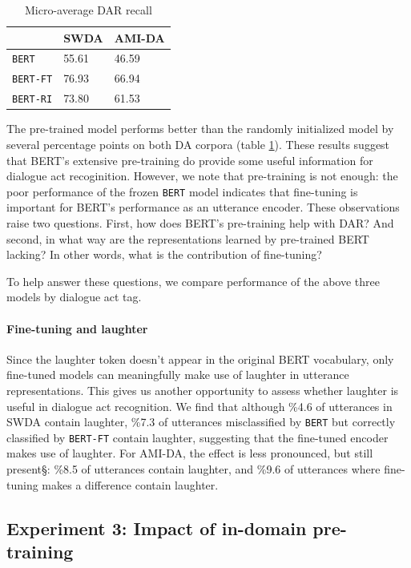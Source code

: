 \documentclass[11pt,a4paper]{article}
\begin{document}
\begin{table}[]
\centering 
\begin{tabular}{@{}lll@{}}
\toprule
                 & SWDA  & AMI-DA \\ \midrule
\texttt{BERT}       & 55.61 & 46.59  \\
\texttt{BERT-FT}    & 76.93 & 66.94  \\
\texttt{BERT-RI}    & 73.80 & 61.53  
\end{tabular}
  \caption{Micro-average DAR recall}
  \label{table:exp2-avg}
\end{table}    

The pre-trained model performs better than the randomly initialized model by several percentage points on both DA corpora (table \ref{table:exp2-avg}). 
These results suggest that BERT's extensive pre-training do provide some useful information for dialogue act recoginition.
However, we note that pre-training is not enough: the poor performance of the frozen \texttt{BERT} model indicates that fine-tuning is important for BERT's performance as an utterance encoder.
These observations raise two questions.
First, how does BERT's pre-training help with DAR? 
And second, in what way are the representations learned by pre-trained BERT lacking?
In other words, what is the contribution of fine-tuning?

To help answer these questions, we compare performance of the above three models by dialogue act tag.


\paragraph{Fine-tuning and laughter}
Since the laughter token doesn't appear in the original BERT vocabulary, only fine-tuned models can meaningfully make use of laughter in utterance representations. 
This gives us another opportunity to assess whether laughter is useful in dialogue act recognition.
We find that although \%4.6 of utterances in SWDA contain laughter, \%7.3 of utterances misclassified by \texttt{BERT} but correctly classified by \texttt{BERT-FT} contain laughter, suggesting that the fine-tuned encoder makes use of laughter. 
For AMI-DA, the effect is less pronounced, but still present§: \%8.5 of utterances contain laughter, and \%9.6 of utterances where fine-tuning makes a difference contain laughter.

\subsection{Experiment 3: Impact of in-domain pre-training} \label{sec:experiment3} %
\end{document}
